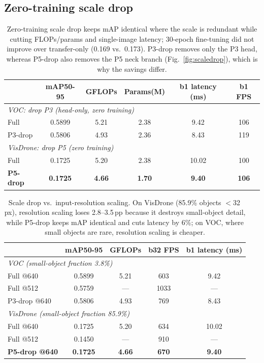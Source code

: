 \documentclass[3p]{elsarticle}
\begin{document}
\subsection{Zero-training scale drop}
\begin{table}[h]\centering\footnotesize
\begin{tabular}{lccccc}
\toprule
 & mAP50-95 & GFLOPs & Params(M) & b1 latency (ms) & b1 FPS\\
\midrule
\multicolumn{6}{l}{\emph{VOC: drop P3 (head-only, zero training)}}\\
Full & 0.5899 & 5.21 & 2.38 & 9.42 & 106\\
P3-drop & 0.5806 & 4.93 & 2.36 & 8.43 & 119\\
\multicolumn{6}{l}{\emph{VisDrone: drop P5 (zero training)}}\\
Full & 0.1725 & 5.20 & 2.38 & 10.02 & 100\\
\textbf{P5-drop} & \textbf{0.1725} & \textbf{4.66} & \textbf{1.70} & \textbf{9.40} & \textbf{106}\\
\bottomrule
\end{tabular}
\caption{Zero-training scale drop keeps mAP identical where the scale is redundant while cutting FLOPs/params and single-image latency; 30-epoch fine-tuning did not improve over transfer-only (0.169 vs.\ 0.173). P3-drop removes only the P3 head, whereas P5-drop also removes the P5 neck branch (Fig.~\ref{fig:scaledrop}), which is why the savings differ.}
\label{tab:scaledrop}
\end{table}
\begin{table}[h]\centering\footnotesize
\begin{tabular}{lcccc}
\toprule
 & mAP50-95 & GFLOPs & b32 FPS & b1 latency (ms)\\
\midrule
\multicolumn{5}{l}{\emph{VOC (small-object fraction 3.8\%)}}\\
Full @640 & 0.5899 & 5.21 & 603 & 9.42\\
Full @512 & 0.5759 & --- & 1033 & ---\\
P3-drop @640 & 0.5806 & 4.93 & 769 & 8.43\\
\multicolumn{5}{l}{\emph{VisDrone (small-object fraction 85.9\%)}}\\
Full @640 & 0.1725 & 5.20 & 634 & 10.02\\
Full @512 & 0.1450 & --- & 910 & ---\\
\textbf{P5-drop @640} & \textbf{0.1725} & \textbf{4.66} & \textbf{670} & \textbf{9.40}\\
\bottomrule
\end{tabular}
\caption{Scale drop vs.\ input-resolution scaling. On VisDrone (85.9\% objects $<$32\,px), resolution scaling loses 2.8--3.5\,pp because it destroys small-object detail, while P5-drop keeps mAP identical and cuts latency by 6\%; on VOC, where small objects are rare, resolution scaling is cheaper.}
\label{tab:rescomp}
\end{table}
\end{document}
